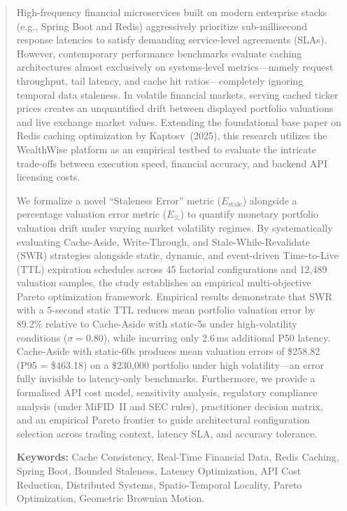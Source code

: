 \documentclass[11pt,a4paper]{article}
\begin{document}
\begin{abstract}
High-frequency financial microservices built on modern enterprise stacks (e.g., Spring Boot and Redis) aggressively prioritize sub-millisecond response latencies to satisfy demanding service-level agreements (SLAs). However, contemporary performance benchmarks evaluate caching architectures almost exclusively on systems-level metrics---namely request throughput, tail latency, and cache hit ratios---completely ignoring temporal data staleness. In volatile financial markets, serving cached ticker prices creates an unquantified drift between displayed portfolio valuations and live exchange market values. Extending the foundational base paper on Redis caching optimization by Kaptosv~(2025), this research utilizes the WealthWise platform as an empirical testbed to evaluate the intricate trade-offs between execution speed, financial accuracy, and backend API licensing costs. 

We formalize a novel ``Staleness Error'' metric ($E_{\text{stale}}$) alongside a percentage valuation error metric ($E_{\%}$) to quantify monetary portfolio valuation drift under varying market volatility regimes. By systematically evaluating Cache-Aside, Write-Through, and Stale-While-Revalidate (SWR) strategies alongside static, dynamic, and event-driven Time-to-Live (TTL) expiration schedules across 45 factorial configurations and 12{,}489 valuation samples, the study establishes an empirical multi-objective Pareto optimization framework. Empirical results demonstrate that SWR with a 5-second static TTL reduces mean portfolio valuation error by 89.2\% relative to Cache-Aside with static-5s under high-volatility conditions ($\sigma=0.80$), while incurring only 2.6\,ms additional P50 latency. Cache-Aside with static-60s produces mean valuation errors of \$258.82 (P95 = \$463.18) on a \$230{,}000 portfolio under high volatility---an error fully invisible to latency-only benchmarks. Furthermore, we provide a formalised API cost model, sensitivity analysis, regulatory compliance analysis (under MiFID~II and SEC rules), practitioner decision matrix, and an empirical Pareto frontier to guide architectural configuration selection across trading context, latency SLA, and accuracy tolerance.

\vspace{0.8em}
\noindent\textbf{Keywords:} Cache Consistency, Real-Time Financial Data, Redis Caching, Spring Boot, Bounded Staleness, Latency Optimization, API Cost Reduction, Distributed Systems, Spatio-Temporal Locality, Pareto Optimization, Geometric Brownian Motion.
\end{abstract}
\end{document}
